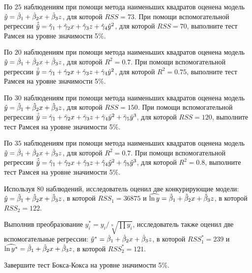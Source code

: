 \documentclass[pdftex,11pt,openany]{book}\usepackage[]{graphicx}\usepackage[]{color}
\begin{document}
\begin{problem}
По $25$ наблюдениям при помощи метода наименьших квадратов оценена
модель $\hat{y}=\hat{\beta}_1+\hat{\beta}_2 x +\hat{\beta}_3 z$, для которой $RSS = 73$. При помощи вспомогательной регрессии $\hat{\hat{y}}=\hat{\gamma}_1+\hat{\gamma}_2 x +\hat{\gamma}_3 z+\hat{\gamma}_4 \hat{y}^2$, для которой $RSS = 70$, выполните тест Рамсея на уровне значимости 5\%. 
\end{problem}

\begin{solution}
\end{solution}


\begin{problem}
По $20$ наблюдениям при помощи метода наименьших квадратов оценена
модель $\hat{y}=\hat{\beta}_1+\hat{\beta}_2 x +\hat{\beta}_3 z$, для которой $R^2 = 0.7$. При помощи вспомогательной регрессии $\hat{\hat{y}}=\hat{\gamma}_1+\hat{\gamma}_2 x +\hat{\gamma}_3 z+\hat{\gamma}_4 \hat{y}^2$, для которой $R^2 = 0.75$, выполните тест Рамсея на уровне значимости 5\%. 
\end{problem}

\begin{solution}
\end{solution}


\begin{problem}
По $30$ наблюдениям при помощи метода наименьших квадратов оценена
модель $\hat{y}=\hat{\beta}_1+\hat{\beta}_2 x +\hat{\beta}_3 z$, для которой $RSS = 150$. При помощи вспомогательной регрессии $\hat{\hat{y}}=\hat{\gamma}_1+\hat{\gamma}_2 x +\hat{\gamma}_3 z+\hat{\gamma}_4 \hat{y}^2+\hat{\gamma}_5 \hat{y}^3$, для которой $RSS = 120$, выполните тест Рамсея на уровне значимости 5\%. 
\end{problem}
\begin{solution}
\end{solution}


\begin{problem}
По $35$ наблюдениям при помощи метода наименьших квадратов оценена
модель $\hat{y}=\hat{\beta}_1+\hat{\beta}_2 x +\hat{\beta}_3 z$, для которой $R^2 = 0.7$. При помощи вспомогательной регрессии $\hat{\hat{y}}=\hat{\gamma}_1+\hat{\gamma}_2 x +\hat{\gamma}_3 z+\hat{\gamma}_4 \hat{y}^2+\hat{\gamma}_5 \hat{y}^3$, для которой $R^2 = 0.8$, выполните тест Рамсея на уровне значимости 5\%. 
\end{problem}

\begin{solution}
\end{solution}

\begin{problem}
Используя 80 наблюдений, исследователь оценил две конкурирующие модели: $\hat{y}=\hat{\beta}_1+\hat{\beta}_2 x +\hat{\beta}_3 z$, в которой $RSS_1=36875$ и $\widehat{\ln y}=\hat{\beta}_1+\hat{\beta}_2 x +\hat{\beta}_3 z$, в которой $RSS_2=122$. 

Выполнив преобразование $y^*_i=y_i/\sqrt[n]{\prod y_i}$, исследователь также оценил две вспомогательные регрессии: $\hat{y}^*=\hat{\beta}_1+\hat{\beta}_2 x +\hat{\beta}_3 z$, в которой $RSS^*_1=239$ и $\widehat{\ln y^*}=\hat{\beta}_1+\hat{\beta}_2 x +\hat{\beta}_3 z$, в которой $RSS^*_2=121$.

Завершите тест Бокса-Кокса на уровне значимости 5\%.
\end{problem}
\end{document}
